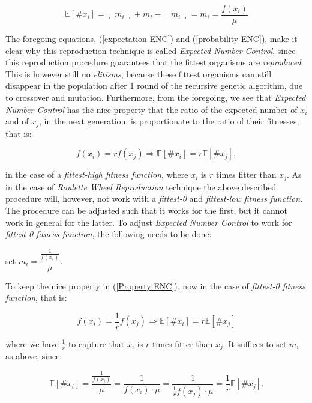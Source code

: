 \documentclass[a4paper]{article}
\newcommand{\fl}{\llcorner}
\newcommand{\fr}{\lrcorner}
\newcommand{\Expec}[1]{\mathbb{E}[#1]}
\theoremstyle{dotless}
\begin{document}
\begin{equation}\label{expectation ENC}
\Expec{\# x_i} = \fl m_i \fr + m_i - \fl m_i \fr = m_i = \dfrac{f(x_i)}{\mu}
\end{equation}

The foregoing equations, (\ref{expectation ENC}) and (\ref{probability ENC}), make it clear why this reproduction technique is called \emph{Expected Number Control}, since this reproduction procedure guarantees that the fittest organisms are \emph{reproduced}. This is however still no \emph{elitisms}, because these fittest organisms can still disappear in the population after 1 round of the recursive genetic algorithm, due to crossover and mutation. Furthermore, from the foregoing, we see that \emph{Expected Number Control} has the nice property that the ratio of the expected number of $x_i$ and of $x_j$, in the next generation, is proportionate to the ratio of their fitnesses, that is:

\begin{equation}\label{Property ENC}
f(x_i) = r f(x_j) \Rightarrow \Expec{ \# x_i } = r \Expec{ \# x_j },
\end{equation}

in the case of a \emph{fittest-high fitness function}, where $x_i$ is $r$ times fitter than $x_j$. As in the case of \emph{Roulette Wheel Reproduction} technique the above described procedure will, however, not work with a \emph{fittest-0} and \emph{fittest-low fitness function}. The procedure can be adjusted such that it works for the first, but it cannot work in general for the latter. To adjust \emph{Expected Number Control} to work for \emph{fittest-0 fitness function}, the following needs to be done:

	\begin{center}
	set $m_i = \dfrac{\frac{1}{f(x_i)}}{\mu}$.
	\end{center}

To keep the nice property in (\ref{Property ENC}), now in the case of \emph{fittest-0 fitness function}, that is:

\begin{equation}
f(x_i) = \frac{1}{r} f(x_j) \Rightarrow \Expec{ \# x_i } = r \Expec{ \# x_j }
\end{equation}

where we have $\frac{1}{r}$ to capture that $x_i$ is $r$ times fitter than $x_j$. It suffices to set $m_i$ as above, since:

\begin{equation}
\Expec{\# x_i} =  \dfrac{\frac{1}{f(x_i)}}{\mu} = \dfrac{1}{f(x_i) \cdot \mu} = \dfrac{1}{\frac{1}{r} f(x_j) \cdot \mu} = \dfrac{1}{r} \Expec{\# x_j}.
\end{equation}
\end{document}
